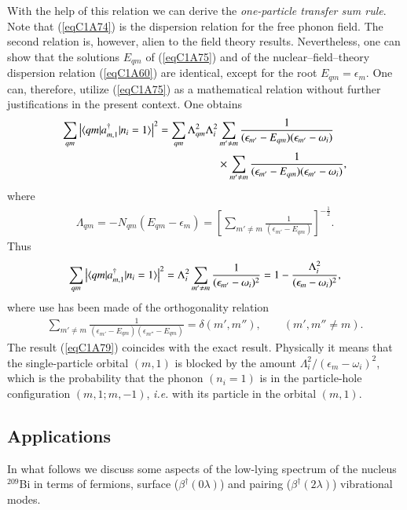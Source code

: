 With the help of this relation we can derive the\textit{ one-particle transfer sum rule}. Note that (\ref{eqC1A74}) is the dispersion relation for the free phonon field. The second relation is, however, alien to the field theory results. Nevertheless, one can show that the solutions $E_{qm}$ of (\ref{eqC1A75}) and of the nuclear--field--theory dispersion relation (\ref{eqC1A60}) are identical, except for the root $E_{qm}=\epsilon_m$. One can, therefore, utilize (\ref{eqC1A75}) as a mathematical relation without further justifications in the 
present context. One obtains 
  \begin{align}\label{eqC1A77} 
   \nonumber \sum_{qm}\left|\langle {qm|a^\dagger_{m,1}|n_i=1} \rangle\right|^2=\sum_{qm}\Lambda_{qm}^2\Lambda_i^2& \sum_{m'\neq m}\frac{1}{(\epsilon_{m'}-E_{qm})(\epsilon_{m'}-\omega_i)}\\
   &\times \sum_{m'\neq m}\frac{1}{(\epsilon_{m'}-E_{qm})(\epsilon_{m'}-\omega_i)},
    \end{align} 
where
  \begin{align}\label{eqC1A78} 
   \Lambda_{qm}=-N_{qm}(E_{qm}-\epsilon_m)=\left[\sum_{m'\neq m}\frac{1}{(\epsilon_{m'}-E_{qm})}\right]^{-\frac{1}{2}}.
    \end{align} 
    Thus
      \begin{align}\label{eqC1A79} 
 \sum_{qm}\left|\langle {qm|a^\dagger_{m,1}|n_i=1} \rangle\right|^2=\Lambda_i^2\sum_{m'\neq m}\frac{1}{(\epsilon_{m'}-\omega_i)^2}=1-\frac{\Lambda^2_i}{(\epsilon_m-\omega_i)^2},     
        \end{align} 
where use has been made of the orthogonality relation 
  \begin{align}\label{eqC1A80} 
\sum_{m'\neq m}\frac{1}{(\epsilon_{m'}-E_{qm})(\epsilon_{m''}-E_{qm})}=\delta(m',m''),\qquad (m',m''\neq m).
    \end{align}  
The result (\ref{eqC1A79}) coincides with the exact result. Physically it means that the single-particle orbital $(m, 1)$ is blocked by the amount $\Lambda_i^2/(\epsilon_m-\omega_i)^2$, which is the probability that the phonon $(n_i= 1)$ is in the particle-hole configuration $(m,1;m,-1)$, \textit{i.e.} with its particle in the orbital $(m,1)$. 
\subsection{Applications}\label{Sect1.7.4}
In what follows we discuss some aspects of the low-lying spectrum of the nucleus $^{209}$Bi in terms of fermions, surface ($\beta^\dagger(0\lambda)$) and pairing ($\beta^\dagger(2\lambda)$) vibrational modes. 

